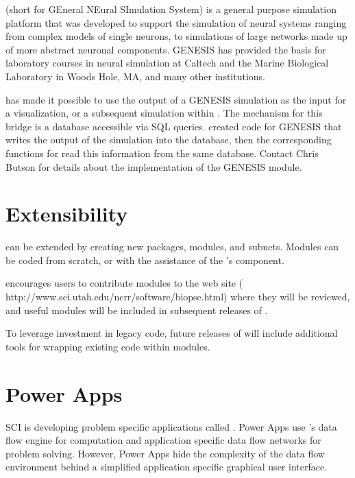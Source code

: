 (short for GEneral NEural SImulation System) is a general purpose
simulation platform that was developed to support the simulation of neural
systems ranging from complex models of single neurons, to simulations of
large networks made up of more abstract neuronal components. GENESIS has
provided the basis for laboratory courses in neural simulation at
Caltech and the Marine Biological Laboratory in Woods Hole, MA, and 
many other institutions.   

\sci{} has made it possible to use the output of a GENESIS simulation
as the input for a visualization, or a subsequent simulation within
\BIOPSE{}.  The mechanism for this bridge is a database accessible via
SQL queries.  \sci{} created code for GENESIS that writes the output
of the simulation into the database, then the corresponding functions
for \SR{} read this information from the same database.  Contact Chris
Butson
for details about the implementation of the GENESIS module.


\section{Extensibility}
\label{sec:con-extend} 


\sr{} can be extended by creating new packages, modules, and subnets.
Modules can be coded from scratch, or with the assistance of the \sr's
 component.

\sci{} encourages users to contribute modules to the \BIOPSE{} web
site 
(
{http://www.sci.utah.edu/ncrr/software/biopse.html}) where they will be
reviewed, and useful modules will be included in subsequent releases
of \sr{}.

To leverage investment in legacy code, future releases of \sr{} will
include additional tools for wrapping existing code within \SR{}
modules.

\section{Power Apps}
\label{sec:sec:con-apps}

SCI is developing problem specific applications called
.  Power Apps use \sr{}'s data flow engine for
computation and application specific data flow networks for problem
solving.  However, Power Apps hide the complexity of the data flow
environment behind a simplified application specific graphical user
interface.

